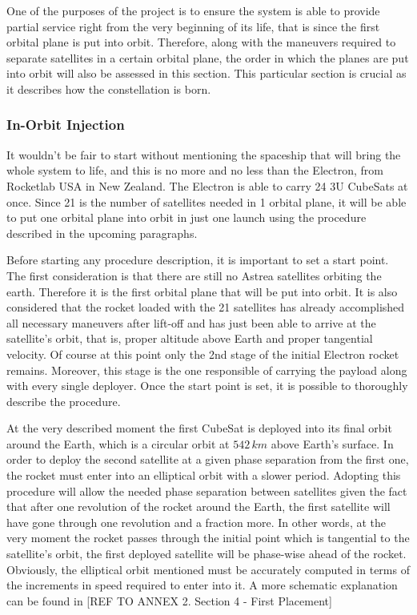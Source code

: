 One of the purposes of the project is to ensure the system is able to provide partial service right from the very beginning of its life, that is since the first orbital plane is put into orbit. Therefore, along with the maneuvers required to separate satellites in a certain orbital plane, the order in which the planes are put into orbit will also be assessed in this section. This particular section is crucial as it describes how the constellation is born.

\subsubsection{In-Orbit Injection}
It wouldn't be fair to start without mentioning the spaceship that will bring the whole system to life, and this is no more and no less than the Electron, from Rocketlab USA in New Zealand. The Electron is able to carry 24 3U CubeSats at once. Since 21 is the number of satellites needed in 1 orbital plane, it will be able to put one orbital plane into orbit in just one launch using the procedure described in the upcoming paragraphs.

Before starting any procedure description, it is important to set a start point. The first consideration is that there are still no Astrea satellites orbiting the earth. Therefore it is the first orbital plane that will be put into orbit. It is also considered that the rocket loaded with the 21 satellites has already accomplished all necessary maneuvers after lift-off and has just been able to arrive at the satellite's orbit, that is, proper altitude above Earth and proper tangential velocity. Of course at this point only the 2nd stage of the initial Electron rocket remains. Moreover, this stage is the one responsible of carrying the payload along with every single deployer. Once the start point is set, it is possible to thoroughly describe the procedure.

At the very described moment the first CubeSat is deployed into its final orbit around the Earth, which is a circular orbit at $542 \,km$ above Earth's surface. In order to deploy the second satellite at a given phase separation from the first one, the rocket must enter into an elliptical orbit with a slower period. Adopting this procedure will allow the needed phase separation between satellites given the fact that after one revolution of the rocket around the Earth, the first satellite will have gone through one revolution and a fraction more. In other words, at the very moment the rocket passes through the initial point which is tangential to the satellite's orbit, the first deployed satellite will be phase-wise ahead of the rocket. Obviously, the elliptical orbit mentioned must be accurately computed in terms of the increments in speed required to enter into it. A more schematic explanation can be found in  [{REF TO ANNEX 2. Section 4 - First Placement}]

